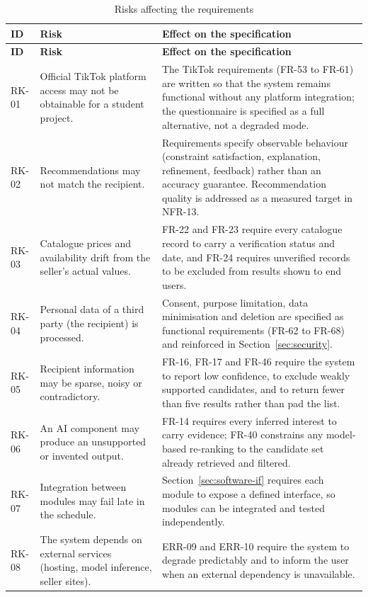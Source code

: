 \documentclass[11pt,a4paper]{report}
\begin{document}
\begin{longtable}{@{}L{1.4cm}L{5.4cm}L{7.6cm}@{}}
\caption{Risks affecting the requirements}\\
\toprule
\textbf{ID} & \textbf{Risk} & \textbf{Effect on the specification} \\ \midrule
\endfirsthead
\toprule \textbf{ID} & \textbf{Risk} & \textbf{Effect on the specification} \\ \midrule
\endhead
\bottomrule
\endfoot
RK-01 & Official TikTok platform access may not be obtainable for a student project. &
The TikTok requirements (FR-53 to FR-61) are written so that the system remains functional
without any platform integration; the questionnaire is specified as a full alternative, not
a degraded mode. \\
RK-02 & Recommendations may not match the recipient. &
Requirements specify observable behaviour (constraint satisfaction, explanation, refinement,
feedback) rather than an accuracy guarantee. Recommendation quality is addressed as a
measured target in NFR-13. \\
RK-03 & Catalogue prices and availability drift from the seller's actual values. &
FR-22 and FR-23 require every catalogue record to carry a verification status and date, and
FR-24 requires unverified records to be excluded from results shown to end users. \\
RK-04 & Personal data of a third party (the recipient) is processed. &
Consent, purpose limitation, data minimisation and deletion are specified as functional
requirements (FR-62 to FR-68) and reinforced in Section~\ref{sec:security}. \\
RK-05 & Recipient information may be sparse, noisy or contradictory. &
FR-16, FR-17 and FR-46 require the system to report low confidence, to exclude weakly
supported candidates, and to return fewer than five results rather than pad the list. \\
RK-06 & An AI component may produce an unsupported or invented output. &
FR-14 requires every inferred interest to carry evidence; FR-40 constrains any model-based
re-ranking to the candidate set already retrieved and filtered. \\
RK-07 & Integration between modules may fail late in the schedule. &
Section~\ref{sec:software-if} requires each module to expose a defined interface, so modules
can be integrated and tested independently. \\
RK-08 & The system depends on external services (hosting, model inference, seller sites). &
ERR-09 and ERR-10 require the system to degrade predictably and to inform the user when an
external dependency is unavailable. \\
\end{longtable}
\end{document}
